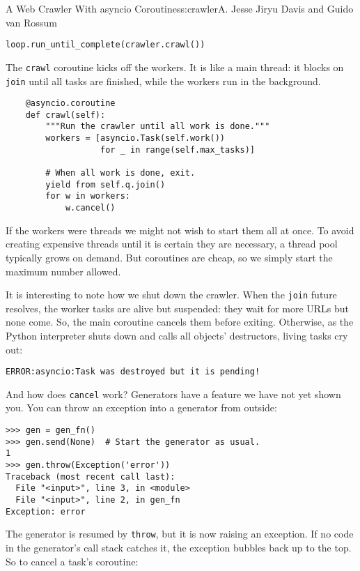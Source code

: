 \begin{aosachapter}{A Web Crawler With asyncio Coroutines}{s:crawler}{A. Jesse Jiryu Davis and Guido van Rossum}
\begin{verbatim}
loop.run_until_complete(crawler.crawl())
\end{verbatim}

The \texttt{crawl} coroutine kicks off the workers. It is like a main
thread: it blocks on \texttt{join} until all tasks are finished, while
the workers run in the background.

\begin{verbatim}
    @asyncio.coroutine
    def crawl(self):
        """Run the crawler until all work is done."""
        workers = [asyncio.Task(self.work())
                   for _ in range(self.max_tasks)]

        # When all work is done, exit.
        yield from self.q.join()
        for w in workers:
            w.cancel()
\end{verbatim}

If the workers were threads we might not wish to start them all at once.
To avoid creating expensive threads until it is certain they are
necessary, a thread pool typically grows on demand. But coroutines are
cheap, so we simply start the maximum number allowed.

It is interesting to note how we shut down the crawler. When the
\texttt{join} future resolves, the worker tasks are alive but suspended:
they wait for more URLs but none come. So, the main coroutine cancels
them before exiting. Otherwise, as the Python interpreter shuts down and
calls all objects' destructors, living tasks cry out:

\begin{verbatim}
ERROR:asyncio:Task was destroyed but it is pending!
\end{verbatim}

And how does \texttt{cancel} work? Generators have a feature we have not
yet shown you. You can throw an exception into a generator from outside:

\begin{verbatim}
>>> gen = gen_fn()
>>> gen.send(None)  # Start the generator as usual.
1
>>> gen.throw(Exception('error'))
Traceback (most recent call last):
  File "<input>", line 3, in <module>
  File "<input>", line 2, in gen_fn
Exception: error
\end{verbatim}

The generator is resumed by \texttt{throw}, but it is now raising an
exception. If no code in the generator's call stack catches it, the
exception bubbles back up to the top. So to cancel a task's coroutine:


\end{aosachapter}

